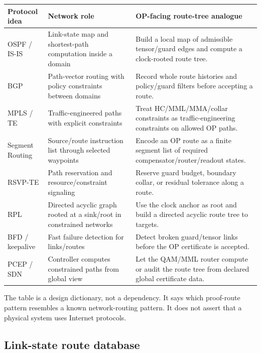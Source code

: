 \begin{center}
\small
\setlength{\tabcolsep}{3pt}
\begin{tabular}{@{}p{}P{0.34\textwidth}P{0.38\textwidth}@{}}
\toprule
Protocol idea & Network role & OP-facing route-tree analogue\\
\midrule
OSPF / IS-IS & Link-state map and shortest-path computation inside a domain &
Build a local map of admissible tensor/guard edges and compute a clock-rooted
route tree.\\
BGP & Path-vector routing with policy constraints between domains &
Record whole route histories and policy/guard filters before accepting a
route.\\
MPLS / TE & Traffic-engineered paths with explicit constraints &
Treat HC/MML/MMA/collar constraints as traffic-engineering constraints on
allowed OP paths.\\
Segment Routing & Source/route instruction list through selected waypoints &
Encode an OP route as a finite segment list of required compensator/router/readout
states.\\
RSVP-TE & Path reservation and resource/constraint signaling &
Reserve guard budget, boundary collar, or residual tolerance along a route.\\
RPL & Directed acyclic graph rooted at a sink/root in constrained networks &
Use the clock anchor as root and build a directed acyclic route tree to targets.\\
BFD / keepalive & Fast failure detection for links/routes &
Detect broken guard/tensor links before the OP certificate is accepted.\\
PCEP / SDN & Controller computes constrained paths from global view &
Let the QAM/MML router compute or audit the route tree from declared global
certificate data.\\
\bottomrule
\end{tabular}
\end{center}

\begin{remark}
\label{rem:v410r13-not-protocol-import}
The table is a design dictionary, not a dependency. It says which proof-route
pattern resembles a known network-routing pattern. It does not assert that a
physical system uses Internet protocols.
\end{remark}

\subsection{Link-state route database}
\label{subsec:v410r13-link-state-route-database}

